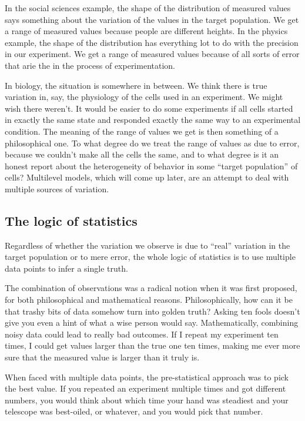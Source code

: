 In the social sciences example, the shape of the distribution of measured
values says something about the variation of the values in the target
population. We get a range of measured values because people are different
heights. In the physics example, the shape of the distribution has everything lot to do
with the precision in our experiment. We get a range of measured values
because of all sorts of error that arie the in the process of experimentation.

In biology, the situation is somewhere in between. We think there is true
variation in, say, the physiology of the cells used in an experiment. We
might wish there weren't. It would be easier to do some experiments if all
cells started in exactly the same state and responded exactly the same way to
an experimental condition. The meaning of the range of values we get is then
something of a philosophical one. To what degree do we treat the range of
values as due to error, because we couldn't make all the cells the same, and
to what degree is it an honest report about the heterogeneity of behavior in
some ``target population'' of cells? Multilevel models, which will come up later,
are an attempt to deal with multiple sources of variation.

\subsection{The logic of statistics}


Regardless of whether the variation we observe is due to ``real'' variation in
the target population or to mere error, the whole logic of statistics is to
use multiple data points to infer a single truth.

The combination of observations was a radical notion when it was first
proposed, for both philosophical and mathematical reasons. Philosophically, how
can it be that trashy bits of data somehow turn into golden truth? Asking ten
fools doesn't give you even a hint of what a wise person would say.
Mathematically, combining noisy data could lead to really bad outcomes. If I
repeat my experiment ten times, I could get values larger than the true one ten
times, making me ever more sure that the measured value is larger than it truly is.

When faced with multiple data points, the pre-statistical approach was to pick
the best value. If you repeated an experiment multiple times and got different
numbers, you would think about which time your hand was steadiest and your
telescope was best-oiled, or whatever, and you would pick that number.

